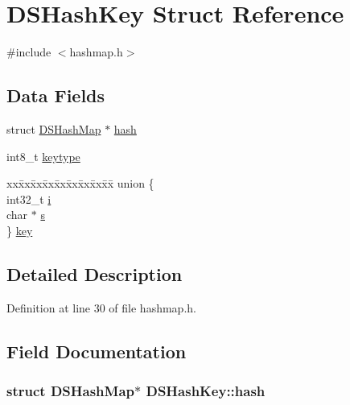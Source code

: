 \hypertarget{structDSHashKey}{}\section{D\+S\+Hash\+Key Struct Reference}
\label{structDSHashKey}


{\ttfamily \#include $<$hashmap.\+h$>$}

\subsection*{Data Fields}
\begin{DoxyCompactItemize}
\item 
struct \hyperlink{structDSHashMap}{D\+S\+Hash\+Map} $\ast$ \hyperlink{structDSHashKey_acd2a8f654f785866f6ac04a12f34198d}{hash}
\item 
int8\+\_\+t \hyperlink{structDSHashKey_a8178bcd0186d5c07c686578355fc86db}{keytype}
\item 
\begin{tabbing}
xx\=xx\=xx\=xx\=xx\=xx\=xx\=xx\=xx\=\kill
union \{\\
\>int32\_t \hyperlink{structDSHashKey_a720d0e6642cda5e1dcb69fc6fbc39597}{i}\\
\>char $\ast$ \hyperlink{structDSHashKey_a769b7d9bdd742b820246da81976265fc}{s}\\
\} \hyperlink{structDSHashKey_ad2ed83c36c76bc722abd06aacce6c688}{key}\\

\end{tabbing}\end{DoxyCompactItemize}


\subsection{Detailed Description}


Definition at line 30 of file hashmap.\+h.



\subsection{Field Documentation}
\subsubsection[{\texorpdfstring{hash}{hash}}]{\setlength{\rightskip}{0pt plus 5cm}struct {\bf D\+S\+Hash\+Map}$\ast$ D\+S\+Hash\+Key\+::hash}\hypertarget{structDSHashKey_acd2a8f654f785866f6ac04a12f34198d}{}\label{structDSHashKey_acd2a8f654f785866f6ac04a12f34198d}


